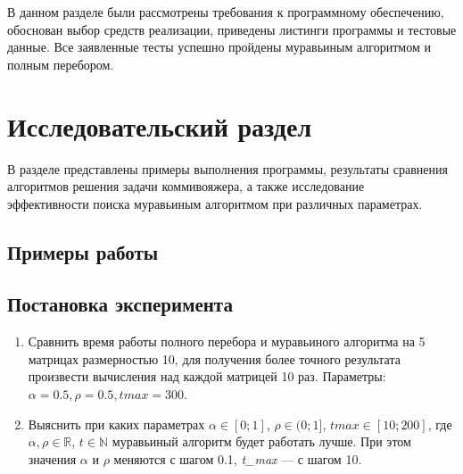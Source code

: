 \documentclass[a4paper,12pt]{article}
\begin{document}
В данном разделе были рассмотрены требования к 
программному обеспечению, обоснован выбор средств 
реализации, приведены листинги программы и тестовые 
данные. Все заявленные тесты успешно пройдены муравьиным алгоритмом и полным перебором.

\section{Исследовательский раздел}

В разделе представлены примеры выполнения программы,
результаты сравнения
алгоритмов решения задачи коммивояжера,
а также исследование \\ эффективности
поиска муравьиным алгоритмом при различных параметрах.

\subsection{Примеры работы}




\subsection{Постановка эксперимента}

\begin{enumerate}
	\item Сравнить время работы полного перебора
	и муравьиного алгоритма на 5 матрицах размерностью 10,
	для получения более точного результата произвести
	вычисления над каждой матрицей 10 раз.
	Параметры: $\alpha = 0.5, \rho = 0.5, tmax = 300$.
	\item Выяснить при каких параметрах $\alpha \in [0; 1]$, $\rho \in (0; 1]$, 
	$tmax \in [10; 200]$, где $\alpha, \rho \in \mathbb{R}$, $t \in \mathbb{N}$
	муравьиный алгоритм будет работать лучше. При этом
	значения $\alpha$ и $\rho$ меняются с шагом 0.1, \textit{t\_max} --- с шагом 10.
\end{enumerate}
\end{document}
